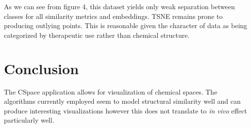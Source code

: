 \documentclass[12pt]{article}
\begin{document}
As we can see from figure 4, this dataset yields only weak separation between classes for all similarity metrics and embeddings. TSNE remains prone to producing outlying points. This is reasonable given the character of data as being categorized by therapeutic use rather than chemical structure.

\section{Conclusion}
The CSpace application allows for visualization of chemical spaces. The algorithms currently employed seem to model structural similarity well and can produce interesting visualizations however this does not translate to \textit{in vivo} effect particularly well.

\newpage


\end{document}
